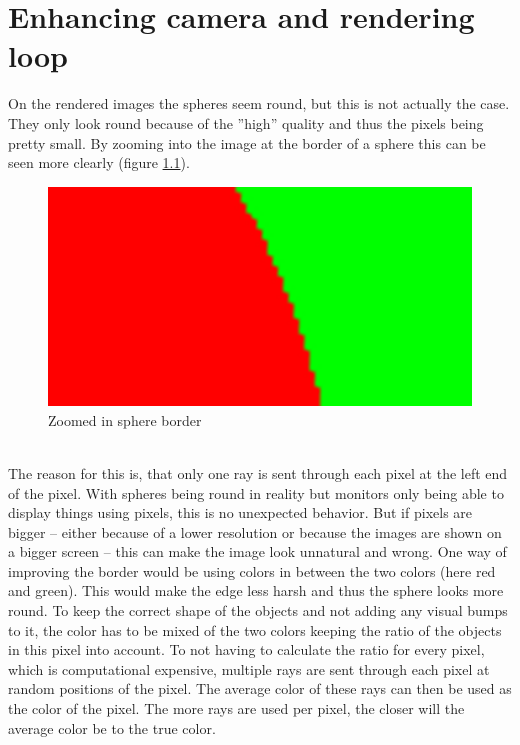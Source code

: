 \documentclass[12pt]{report}
\begin{document}
\chapter{Enhancing camera and rendering loop}
On the rendered images the spheres seem round, but this is not actually the case. They only look round because of the ''high'' quality and thus the pixels being pretty small. By zooming into the image at the border of a sphere this can be seen more clearly (figure \ref{fig:aliasing}).
\begin{figure}[h!]
\includegraphics[width=\textwidth]{aliasing}
\centering
\caption{Zoomed in sphere border}
\label{fig:aliasing}
\end{figure} \\
The reason for this is, that only one ray is sent through each pixel at the left end of the pixel. With spheres being round in reality but monitors only being able to display things using pixels, this is no unexpected behavior. But if pixels are bigger -- either because of a lower resolution or because the images are shown on a bigger screen -- this can make the image look unnatural and wrong. One way of improving the border would be using colors in between the two colors (here red and green). This would make the edge less harsh and thus the sphere looks more round. To keep the correct shape of the objects and not adding any visual bumps to it, the color has to be mixed of the two colors keeping the ratio of the objects in this pixel into account. To not having to calculate the ratio for every pixel, which is computational expensive, multiple rays are sent through each pixel at random positions of the pixel. The average color of these rays can then be used as the color of the pixel. The more rays are used per pixel, the closer will the average color be to the true color.
\end{document}

